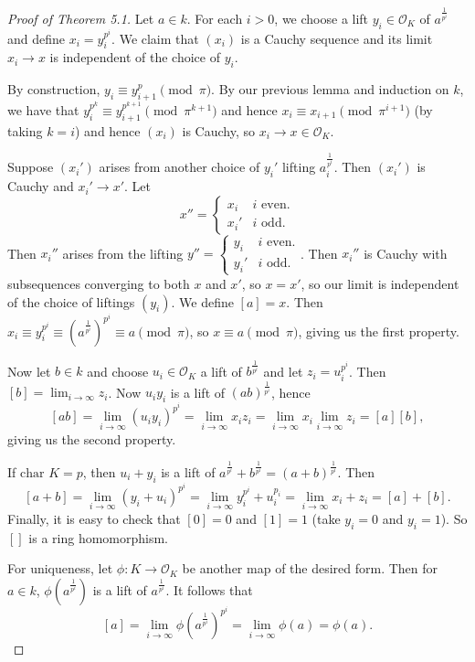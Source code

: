 \documentclass{article}
\theoremstyle{definition}
\begin{document}
\begin{proof}[Proof of Theorem 5.1]
    Let $a \in k$. For each $i>0$, we choose a lift $y_i \in \mathcal{O}_K$ of $a^{\frac{1}{p^i}}$ and define $x_i = y_i^{p^i}$. We claim that $(x_i)$ is a Cauchy sequence and its limit $x_i \to x$ is independent of the choice of $y_i$.
    \vspace{1mm}
     
    By construction, $y_i  \equiv  y_{i+1}^p \pmod{\pi}$. By our previous lemma and induction on $k$, we have that $y_i^{p^k} \equiv y_{i+1}^{p^{k+1}}\pmod{\pi^{k+1}}$ and hence $x_i \equiv x_{i+1} \pmod{\pi^{i+1}}$ (by taking $k=i$) and hence $(x_i)$ is Cauchy, so $x_i \to x \in \mathcal{O}_K$. \vspace{1mm}
     
    Suppose $(x_i')$ arises from another choice of $y_i'$ lifting $a_i^{\frac{1}{p^i}}$. Then $(x_i')$ is Cauchy and $x_i' \to x'$. Let \[
    x'' = \begin{cases}
        x_i &i \text{ even.}\\
        x_i' &i \text{ odd}.
    \end{cases}
    \]
    Then $x_i''$ arises from the lifting $y'' = \begin{cases}
        y_i &i \text{ even.}\\
    y_i' &i \text{ odd}.\end{cases}$. Then $x_i''$ is Cauchy with subsequences converging to both $x$ and $x'$, so $x = x'$, so our limit is independent of the choice of liftings $(y_i)$.
    \vspace{1mm}
    We define $[a] = x$. Then $x_i \equiv y_i^{p^i} \equiv \left(a^{\frac{1}{p^i}}\right)^{p^i} \equiv a \pmod{\pi}$, so $x \equiv a \pmod{\pi}$, giving us the first property.
    \vspace{1mm}
     
    Now let $b \in k$ and choose $u_i \in \mathcal{O}_K$ a lift of $b^{\frac{1}{p^i}}$ and let $z_i = u_i^{p^i}$. Then $[b] = \lim_{i \to \infty}z_i$. Now $u_iy_i$ is a lift of $(ab)^{\frac{1}{p^i}}$, hence $$[ab] = \lim_{i \to \infty} (u_iy_i)^{p^i} = \lim_{i \to \infty} x_i z_i = \lim_{i \to \infty} x_i \lim_{i \to \infty}z_i = [a][b],$$
    giving us the second property.
    \vspace{1mm}
    
    If $\text{char }K = p$, then $u_i+y_i$ is a lift of $a^{\frac{1}{p^i}}+b^{\frac{1}{p^i}} = \left(a+b \right)^{\frac{1}{p^i}}$. Then \[
    [a+b] = \lim_{i \to \infty} (y_i+u_i)^{p^i} = \lim_{i \to \infty}y_i^{p^i} + u_i^{p_i} = \lim_{i \to \infty}x_i + z_i = [a] + [b].
    \]
    Finally, it is easy to check that $[0] = 0$ and $[1] = 1$ (take $y_i=0$ and $y_i=1$). So $[]$ is a ring homomorphism.
    \vspace{1mm}
     
    For uniqueness, let $\phi: K \to \mathcal{O}_K$ be another map of the desired form. Then for $a \in k$, $\phi\left(a^{\frac{1}{p^i}}\right)$ is a lift of $a^{\frac{1}{p^i}}$. It follows that $$[a] = \lim_{i \to \infty} \phi\left(a^{\frac{1}{p^i}}\right)^{p^i} = \lim_{i \to \infty} \phi(a) = \phi(a).$$
\end{proof}
\end{document}
